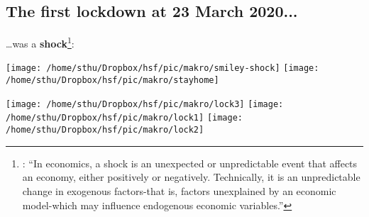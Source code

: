 


\subsection{The first lockdown at 23 March 2020...}

\dots was a \textbf{shock}\footnote{\citet[][Entry: Shock (economics)]{Wikipedia2022}:
		``In economics, a shock is an unexpected or unpredictable event that affects an economy, either positively or negatively. Technically, it is an unpredictable change in exogenous factors-that is, factors unexplained by an economic model-which may influence endogenous economic variables.''
}:


\begin{center}
\texttt{[image: /home/sthu/Dropbox/hsf/pic/makro/smiley-shock]}
\texttt{[image: /home/sthu/Dropbox/hsf/pic/makro/stayhome]}
\end{center}

\texttt{[image: /home/sthu/Dropbox/hsf/pic/makro/lock3]}
\texttt{[image: /home/sthu/Dropbox/hsf/pic/makro/lock1]}
\texttt{[image: /home/sthu/Dropbox/hsf/pic/makro/lock2]}




{}



